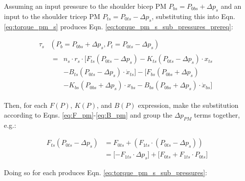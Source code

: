 \documentclass[conference]{IEEEtran}
\begin{document}
	Assuming an input pressure to the shoulder bicep \ac{PM} $P_{bs} = P_{0bs} + \Delta p_{s}$ and an input to the shoulder tricep \ac{PM} $P_{ts} = P_{0ts} - \Delta p_{s}$, substituting this into Eqn. \eqref{eq:torque_pm_s} produces Eqn. \eqref{eq:torque_pm_s_sub_pressures_prereq}:

	\begin{equation}\label{eq:torque_pm_s_sub_pressures_prereq}
		\begin{aligned}
			\tau_{s}&(P_{b}=P_{0bs}+\Delta p_{s}, P_{t}=P_{0ts}-\Delta p_{s})\\
			&
			\begin{aligned}
				=&n_{s} \cdot r_{s} \cdot \lbrack F_{ts}(P_{0ts}-\Delta p_{s})-K_{ts}(P_{0ts}-\Delta p_{s}) \cdot x_{ts}\\
				&- B_{ts}(P_{0ts}-\Delta p_{s}) \cdot \dot{x}_{ts} \rbrack - \lbrack F_{bs}(P_{0bs}+\Delta p_{s})\\
				&-K_{bs}(P_{0bs}+\Delta p_{s}) \cdot x_{bs}-B_{bs}(P_{0bs}+\Delta p_{s}) \cdot \dot{x}_{bs} \rbrack
			\end{aligned}
		\end{aligned}
	\end{equation}

	Then, for each $F(P)$, $K(P)$, and $B(P)$ expression, make the substitution according to Eqns. \eqref{eq:F_pm}-\eqref{eq:B_pm} and group the $\Delta p_{PM}$ terms together, e.g.:
	
	\begin{equation}\label{eq:example_expand_sub_pressures}
		\begin{aligned}
			F_{ts}(P_{0ts}-\Delta p_{s}) &= F_{0ts} + (F_{1ts} \cdot (P_{0ts}-\Delta p_{s}))\\
			&= \lbrack -F_{1ts} \cdot \Delta p_{s} \rbrack + \lbrack F_{0ts} + F_{1ts} \cdot P_{0ts} \rbrack
		\end{aligned}
	\end{equation}

	Doing so for each produces Eqn. \eqref{eq:torque_pm_s_sub_pressures}:
\end{document}
